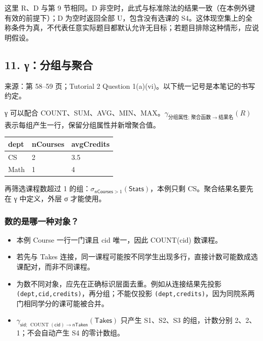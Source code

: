 这里 R、D 与第 9 节相同。D 非空时，此式与标准除法的结果一致（在本例外键有效的前提下）；D 为空时返回全部 U，包含没有选课的 S4。这体现空集上的全称条件为真，不代表任意实际题目都默认允许无目标；若题目排除这种情形，应说明假设。

\subsection{11. γ：分组与聚合}\label{05_relational_algebra_zh-ux3b3ux5206ux7ec4ux4e0eux805aux5408}

来源：第 58--59 页；Tutorial 2 Question 1(a)(vi)。以下统一记号是本笔记的书写约定。

γ 可以配合 COUNT、SUM、AVG、MIN、MAX。\(\gamma _{\text{分}\text{组}\text{属}\text{性};\,\text{聚}\text{合}\text{函}\text{数}\rightarrow \text{结}\text{果}\text{名}}(R)\) 表示每组产生一行，保留分组属性并新增聚合值。


\begin{longtable}[]{@{}lll@{}}
\toprule\noalign{}
dept & nCourses & avgCredits \\
\midrule\noalign{}
\endhead
\bottomrule\noalign{}
\endlastfoot
CS & 2 & 3.5 \\
Math & 1 & 4 \\
\end{longtable}

再筛选课程数超过 1 的组：\(\sigma _{\mathsf{nCourses}>1}(\mathsf{Stats})\)，本例只剩 CS。聚合结果名要先在 γ 中定义，外层 σ 才能使用。

\subsubsection{数的是哪一种对象？}\label{05_relational_algebra_zh-ux6570ux7684ux662fux54eaux4e00ux79cdux5bf9ux8c61}

\begin{itemize}
\tightlist
\item
  本例 Course 一行一门课且 cid 唯一，因此 COUNT(cid) 数课程。
\item
  若先与 Takes 连接，同一课程可能按不同学生出现多行，直接计数可能数成选课配对，而非不同课程。
\item
  为数不同对象，应先在正确标识层面去重。例如从连接结果先投影 \texttt{(\allowbreak{}dept,\allowbreak{}cid,\allowbreak{}credits)\allowbreak{}}，再分组；不能仅投影 \texttt{(\allowbreak{}dept,\allowbreak{}credits)\allowbreak{}}，因为同院系两门相同学分的课可能被合并。
\item
  \(\gamma _{\mathsf{sid};\,\operatorname{COUNT}(\mathsf{cid})\rightarrow \mathsf{nTaken}}(\mathsf{Takes})\) 只产生 S1、S2、S3 的组，计数分别 2、2、1；不会自动产生 S4 的零计数组。
\end{itemize}

